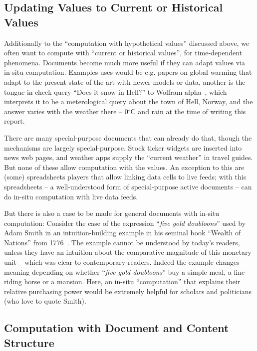 \subsection{Updating Values to Current or Historical Values}\label{sec:ex:current}

Additionally to the ``computation with hypothetical values'' discussed above, we often
want to compute with ``current or historical values'', for time-dependent
phenomena. Documents become much more useful if they can adapt values via in-situ
computation. Examples uses would be e.g. papers on global warming that adapt to the
present state of the art with newer models or data, another is the tongue-in-cheek query
``Does it snow in Hell?'' to Wolfram alpha~\cite{WolframAlpha:on}, which interprets it to
be a meterological query about the town of Hell, Norway, and the answer varies with the
weather there -- 0$^\circ$C and rain at the time of writing this report. 

There are many special-purpose documents that can already do that, though the mechanisms
are largely special-purpose. Stock ticker widgets are inserted into news web pages, and
weather apps supply the ``current weather'' in travel guides. But none of these allow
computation with the values. An exception to this are (some) spreadsheets players that
allow linking data cells to live feeds; with this spreadsheets -- a well-understood form
of special-purpose active documents -- can do in-situ computation with live data feeds.

But there is also a case to be made for general documents with in-situ computation:
Consider the case of the expression ``\emph{five gold doubloons}'' used by Adam Smith in
an intuition-building example in his seminal book ``Wealth of Nations'' from
1776~\cite{Smith:WoN1776}. The example cannot be understood by today's readers, unless
they have an intuition about the comparative magnitude of this monetary unit -- which was clear
to contemporary readers. Indeed the example changes meaning depending on whether
``\emph{five gold doubloons}'' buy a simple meal, a fine riding horse or a mansion. Here,
an in-situ ``computation'' that explains their relative purchasing power would be
extremely helpful for scholars and politicians (who love to quote Smith).

\subsection{Computation with Document and Content Structure}\label{sec:ex:docstruct}

